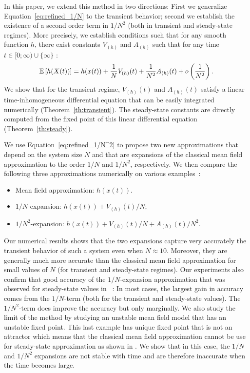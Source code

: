 \documentclass[sigconf]{acmart}
\newcommand\esp[1]{{\mathchoice{\besp{#1}}{\sesp{#1}}{\sesp{#1}}{\sesp{#1}}}}
\newcommand\besp[1]{\mathbb{E}\left[#1\right]}
\newcommand\sesp[1]{\mathbb{E}[#1]}
\newcommand\p[1]{\left(#1\right)}
\begin{document}
In this paper, we extend this method in two directions: First we
generalize Equation~\eqref{eq:refined_1/N} to the transient behavior;
second we establish the existence of a second order term in
$1/N^2$ (both in transient and steady-state regimes). More precisely,
we establish conditions such that for any smooth function $h$, there
exist constants $V_{(h)}$ and $A_{(h)}$ such that for any time
$t\in[0;\infty)\cup\{\infty\}$ :
\begin{align}
  \label{eq:refined_1/N^2}
  \esp{h(X(t))} = h(x(t)) + \frac1N V_{(h)}(t) + \frac1{N^2} A_{(h)}(t) +
  o\p{\frac1{N^2}}.  
\end{align}
We show that for the transient regime, $V_{(h)}(t)$ and $A_{(h)}(t)$
satisfy a linear time-inhomogeneous differential equation that can be
easily integrated numerically (Theorem~\ref{th:transient}). The
steady-state constants are directly computed from the fixed point of
this linear differential equation (Theorem~\ref{th:steady}).

We use Equation~\eqref{eq:refined_1/N^2} to propose two new
approximations that depend on the system size $N$ and that are
expansions of the classical mean field approximation to the order
$1/N$ and $1/N^2$, respectively. We then compare the following three
approximations numerically on various examples~:
\begin{itemize}
\item Mean field approximation: $h(x(t))$.
\item $1/N$-expansion: $h(x(t))+V_{(h)}(t)/N$;
\item $1/N^2$-expansion: $h(x(t))+V_{(h)}(t)/N+A_{(h)}(t)/N^2$.
\end{itemize}
Our numerical results shows that the two expansions capture very
accurately the transient behavior of such a system even when
$N\approx10$. Moreover, they are generally much more accurate than the
classical mean field approximation for small values of $N$ (for
transient and steady-state regimes).  Our experiments also confirm
that good accuracy of the $1/N$-expansion approximation that was
observed for steady-state values in \cite{gast2017refined}~: In most
cases, the largest gain in accuracy comes from the $1/N$-term (both
for the transient and steady-state values).  The $1/N^2$-term does
improve the accuracy but only marginally.  We also study the limit of
the method by studying an unstable mean field model that has an
unstable fixed point. This last example has unique fixed point that is
not an attractor which means that the classical mean field
approximation cannot be use for steady-state approximation as shown in
\cite{benaim2008class}.  We show that in this case, the $1/N$ and
$1/N^2$ expansions are not stable with time and are therefore
inaccurate when the time becomes large. 
\end{document}
